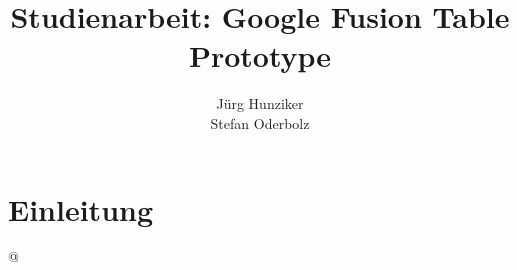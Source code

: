 \title{\textbf{Studienarbeit: Google Fusion Table Prototype}}
\author{J\"urg Hunziker\\
		Stefan Oderbolz}
\date{}



\maketitle

\chapter{Einleitung}
\label{chp:einleitung}


@